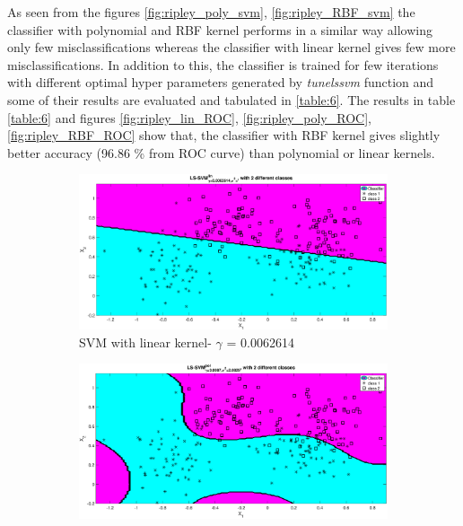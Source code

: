 {As seen from the figures \ref{fig:ripley_poly_svm}, \ref{fig:ripley_RBF_svm} the classifier with polynomial and RBF kernel performs in a similar way allowing only few misclassifications whereas the classifier with linear kernel gives few more misclassifications. In addition to this, the classifier is trained for few iterations with different optimal hyper parameters generated by \textit{tunelssvm} function and some of their results are evaluated and tabulated in \ref{table:6}. The results in table \ref{table:6} and  figures \ref{fig:ripley_lin_ROC}, \ref{fig:ripley_poly_ROC}, \ref{fig:ripley_RBF_ROC} show that, the classifier with RBF kernel gives slightly better accuracy (96.86 \% from ROC curve) than polynomial or linear kernels.
\begin{figure}[!ht] 
	\centering
	\begin{subfigure}{.35\textwidth}
		\centering
		\captionsetup{width=0.8\linewidth}
		\includegraphics[height=.65\linewidth, width=0.9\linewidth]{Exercise1/Report/ripley/ripley_lin_svm.eps}
		\caption{SVM with linear kernel- $\gamma$ = 0.0062614 }
		\label{fig:ripley_lin_svm}
	\end{subfigure}%
	\begin{subfigure}{.35\textwidth}
		\centering
		\captionsetup{width=0.8\linewidth}
		\includegraphics[height=.65\linewidth, width=0.9\linewidth]{Exercise1/Report/ripley/ripley_ploy_svm.eps}

\end{subfigure}
\end{figure}}
